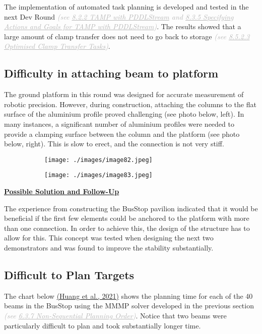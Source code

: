 The implementation of automated task planning is developed and tested in the next Dev Round \textit{\textcolor[HTML]{B7B7B7}{(see \uline{8.2.2 TAMP with PDDLStream} and \uline{8.3.5 Specifying Actions and Goals for TAMP with PDDLStream})}}. The results showed that a large amount of clamp transfer does not need to go back to storage \textit{\textcolor[HTML]{B7B7B7}{(see \uline{8.5.2.3 Optimised Clamp Transfer Tasks})}}.

\subsection{Difficulty in attaching beam to platform}

The ground platform in this round was designed for accurate measurement of robotic precision. However, during construction, attaching the columns to the flat surface of the aluminium profile proved challenging (see photo below, left). In many instances, a significant number of aluminium profiles were needed to provide a clamping surface between the column and the platform (see photo below, right). This is slow to erect, and the connection is not very stiff.

\begin{figure}[H]
\centering
\begin{subfigure}[b]{0.45\textwidth}
\centering
\texttt{[image: ./images/image82.jpeg]}
\end{subfigure}
\hfill
\begin{subfigure}[b]{0.45\textwidth}
\centering
\texttt{[image: ./images/image83.jpeg]}
\end{subfigure}
\end{figure}


\textbf{\uline{Possible Solution and Follow-Up}}

The experience from constructing the BusStop pavilion indicated that it would be beneficial if the first few elements could be anchored to the platform with more than one connection. In order to achieve this, the design of the structure has to allow for this. This concept was tested when designing the next two demonstrators and was found to improve the stability substantially.

\subsection{Difficult to Plan Targets}

The chart below  \href{https://www.zotero.org/google-docs/?U91Ddz}{(Huang et al., 2021)} shows the planning time for each of the 40 beams in the BusStop using the MMMP solver developed in the previous section \textit{\textcolor[HTML]{B7B7B7}{(see \uline{6.3.7 Non-Sequential Planning Order})}}. Notice that two beams were particularly difficult to plan and took substantially longer time. 


